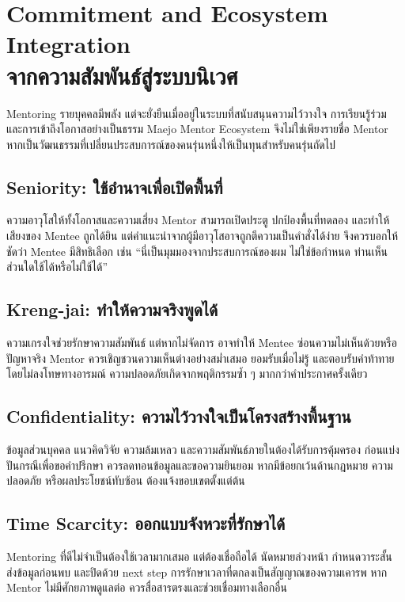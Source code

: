 \chapter{Commitment and Ecosystem Integration\\จากความสัมพันธ์สู่ระบบนิเวศ}

Mentoring รายบุคคลมีพลัง แต่จะยั่งยืนเมื่ออยู่ในระบบที่สนับสนุนความไว้วางใจ การเรียนรู้ร่วม และการเข้าถึงโอกาสอย่างเป็นธรรม Maejo Mentor Ecosystem จึงไม่ใช่เพียงรายชื่อ Mentor หากเป็นวัฒนธรรมที่เปลี่ยนประสบการณ์ของคนรุ่นหนึ่งให้เป็นทุนสำหรับคนรุ่นถัดไป


\section{Seniority: ใช้อำนาจเพื่อเปิดพื้นที่}
ความอาวุโสให้ทั้งโอกาสและความเสี่ยง Mentor สามารถเปิดประตู ปกป้องพื้นที่ทดลอง และทำให้เสียงของ Mentee ถูกได้ยิน แต่คำแนะนำจากผู้มีอาวุโสอาจถูกตีความเป็นคำสั่งได้ง่าย จึงควรบอกให้ชัดว่า Mentee มีสิทธิเลือก เช่น \enquote{นี่เป็นมุมมองจากประสบการณ์ของผม ไม่ใช่ข้อกำหนด ท่านเห็นส่วนใดใช้ได้หรือไม่ใช้ได้}

\section{Kreng-jai: ทำให้ความจริงพูดได้}
ความเกรงใจช่วยรักษาความสัมพันธ์ แต่หากไม่จัดการ อาจทำให้ Mentee ซ่อนความไม่เห็นด้วยหรือปัญหาจริง Mentor ควรเชิญชวนความเห็นต่างอย่างสม่ำเสมอ ยอมรับเมื่อไม่รู้ และตอบรับคำท้าทายโดยไม่ลงโทษทางอารมณ์ ความปลอดภัยเกิดจากพฤติกรรมซ้ำ ๆ มากกว่าคำประกาศครั้งเดียว

\section{Confidentiality: ความไว้วางใจเป็นโครงสร้างพื้นฐาน}
ข้อมูลส่วนบุคคล แนวคิดวิจัย ความล้มเหลว และความสัมพันธ์ภายในต้องได้รับการคุ้มครอง ก่อนแบ่งปันกรณีเพื่อขอคำปรึกษา ควรลดทอนข้อมูลและขอความยินยอม หากมีข้อยกเว้นด้านกฎหมาย ความปลอดภัย หรือผลประโยชน์ทับซ้อน ต้องแจ้งขอบเขตตั้งแต่ต้น

\section{Time Scarcity: ออกแบบจังหวะที่รักษาได้}
Mentoring ที่ดีไม่จำเป็นต้องใช้เวลามากเสมอ แต่ต้องเชื่อถือได้ นัดหมายล่วงหน้า กำหนดวาระสั้น ส่งข้อมูลก่อนพบ และปิดด้วย next step การรักษาเวลาที่ตกลงเป็นสัญญาณของความเคารพ หาก Mentor ไม่มีศักยภาพดูแลต่อ ควรสื่อสารตรงและช่วยเชื่อมทางเลือกอื่น

